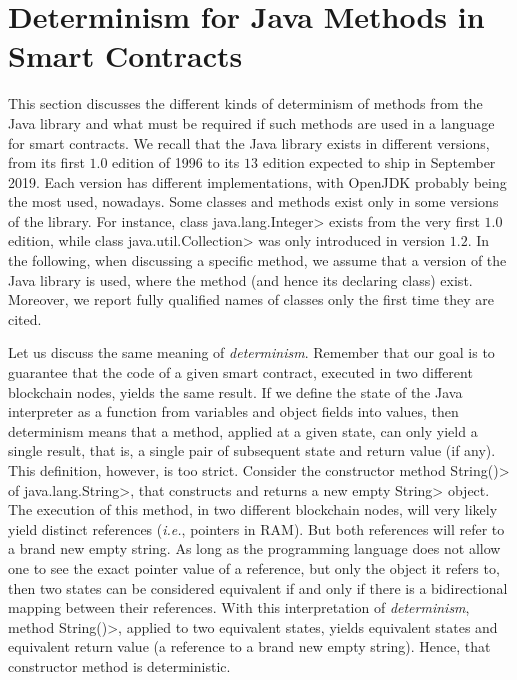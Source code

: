 \section{Determinism for Java Methods in Smart Contracts}\label{sec:determinism}

This section discusses the different kinds of determinism of methods from
the Java library and what must be required if such methods are used
in a language for smart contracts.
We recall that the Java library exists in different versions, from its first
$1.0$ edition of 1996 to its $13$ edition expected to ship in September 2019.
Each version has different implementations, with OpenJDK probably being
the most used, nowadays. Some classes and methods exist only in some versions of the library.
For instance, class \<java.lang.Integer> exists from the very first $1.0$ edition,
while class \<java.util.Collection> was only introduced in version $1.2$.
In the following, when discussing a specific method, we assume that a version
of the Java library is used, where the method (and hence its declaring class) exist.
Moreover, we report fully qualified names of classes only the first time they are cited.

Let us discuss the same meaning of \emph{determinism}. Remember that
our goal is to guarantee that the code of a given smart contract, executed
in two different blockchain nodes, yields the same result.
If we define the state
of the Java interpreter as a function from variables and object fields into values, then
determinism means that a method, applied at a given state, can only yield a single result,
that is, a single pair of subsequent state and return value (if any).
This definition, however, is too strict. Consider the constructor method
\<String()> of \<java.lang.String>, that constructs and returns a new empty \<String>
object. The execution of this method, in two different blockchain nodes,
will very likely yield distinct references (\emph{i.e.}, pointers in RAM).
But both references will refer to a brand new empty string.
As long as the programming language does not allow one to see
the exact pointer value of a reference, but only the object it refers to,
then two states can be considered equivalent if and only if there is
a bidirectional mapping between their references.
With this interpretation of \emph{determinism}, method \<String()>, applied to two equivalent
states, yields equivalent states and equivalent return value (a reference to
a brand new empty string).
Hence, that constructor method is deterministic.

